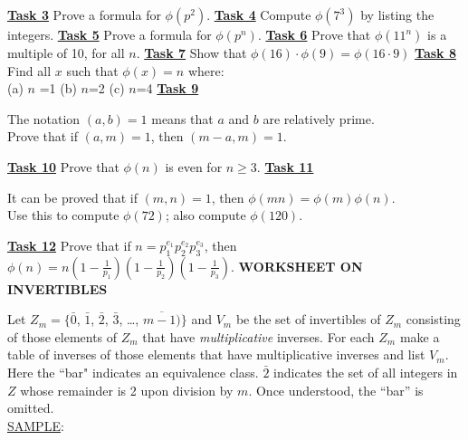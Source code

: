 \documentclass[12pt, fleqn, oneside]{book}
\begin{document}
\underline{\bf{Task 3}} Prove a formula for $\phi(p^2)$.\vfill
\underline{\bf{Task 4}} Compute $\phi(7^3)$ by listing the integers.\vfill
\underline{\bf{Task 5}} Prove a formula for $\phi(p^n)$.\vfill
\underline{\bf{Task 6}} Prove that $\phi(11^n)$ is a multiple of 10, for all $n$.\vfill
\underline{\bf{Task 7}} Show that $\phi(16)\cdot\phi(9) =  \phi(16\cdot 9)$\vfill
\clearpage
\underline{\bf{Task 8}} Find all $x$ such that $\phi(x)=n$ where:\\[.1in]
(a) $n$ =1 \hfill (b) $n$=2 \hfill (c) $n$=4 \hspace{2in} \vfill
\underline{\bf{Task 9}} \begin{minipage}[t]{6in}The notation $(a,b)=1$ means that $a$ and $b$ are relatively prime.\\
Prove that if $(a,m)=1$, then $(m-a,m)=1$.\end{minipage}\vfill
\underline{\bf{Task 10}} Prove that $\phi(n)$ is even for $n\geq 3$.\vfill
\underline{\bf{Task 11}} \begin{minipage}[t]{6in}It can be proved that if $(m,n)=1$, then $\phi(mn)=\phi(m)\phi(n)$.\\
Use this to compute $\phi(72)$; also compute $\phi(120)$.\end{minipage}\vfill
\underline{\bf{Task 12}} Prove that if $n=p_1^{e_1}p_2^{e_2}p_3^{e_3}$, then $\phi(n)=n\left(1-\frac{1}{p_1}\right)\left(1-\frac{1}{p_2}\right)\left(1-\frac{1}{p_3}\right)$.\vfill
%
%
%
\clearpage
%
%
%
{\large \bf WORKSHEET ON INVERTIBLES}\\[.25in]
Let $Z_m=\{\bar{0}$, $\bar{1}$, $\bar{2}$, $\bar{3}$, \dots, $\overline{m-1)}\}$ and $V_m$ be the set of invertibles of $Z_m$ consisting of those elements of $Z_m$ that have \textit{multiplicative} inverses.  For each $Z_m$ make a table of inverses of those elements that have multiplicative inverses and list $V_m$.  Here the ``bar" indicates an equivalence class.  $\bar{2}$ indicates the set of all integers in $Z$ whose remainder is 2 upon division by $m$.  Once understood, the ``bar'' is omitted.\\[.25in]
\underline{SAMPLE}:\\
\end{document}
